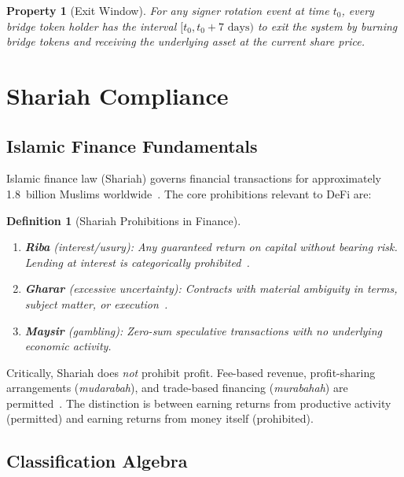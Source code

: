 \documentclass[11pt,twocolumn]{article}
\newtheorem{definition}[theorem]{Definition}
\newtheorem{property}[theorem]{Property}
\theoremstyle{definition}
\begin{document}
\begin{property}[Exit Window]
\label{prop:exit}
For any signer rotation event at time $t_0$, every bridge token holder has the interval $[t_0, t_0 + 7 \text{ days})$ to exit the system by burning bridge tokens and receiving the underlying asset at the current share price.
\end{property}

\section{Shariah Compliance}
\label{sec:shariah}

\subsection{Islamic Finance Fundamentals}

Islamic finance law (Shariah) governs financial transactions for approximately 1.8~billion Muslims worldwide~\cite{usmani2002}. The core prohibitions relevant to DeFi are:

\begin{definition}[Shariah Prohibitions in Finance]
\label{def:prohibitions}
\begin{enumerate}[nosep]
  \item \textbf{Riba} (interest/usury): Any guaranteed return on capital without bearing risk. Lending at interest is categorically prohibited~\cite{iqbal2011}.
  \item \textbf{Gharar} (excessive uncertainty): Contracts with material ambiguity in terms, subject matter, or execution~\cite{elgari2003}.
  \item \textbf{Maysir} (gambling): Zero-sum speculative transactions with no underlying economic activity.
\end{enumerate}
\end{definition}

Critically, Shariah does \emph{not} prohibit profit. Fee-based revenue, profit-sharing arrangements (\emph{mudarabah}), and trade-based financing (\emph{murabahah}) are permitted~\cite{usmani2002}. The distinction is between earning returns from productive activity (permitted) and earning returns from money itself (prohibited).

\subsection{Classification Algebra}
\end{document}
